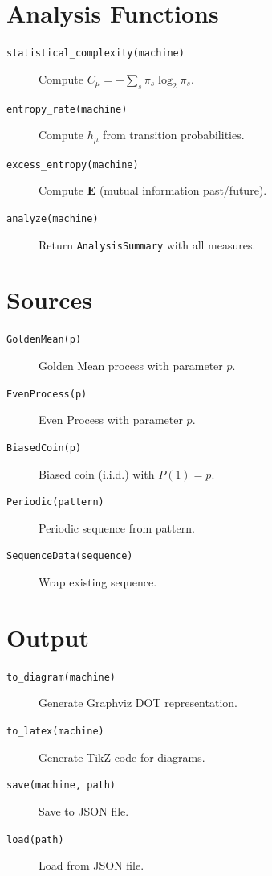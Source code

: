 \documentclass[11pt,a4paper]{report}
\theoremstyle{definition}
\theoremstyle{plain}
\newcommand{\Cmu}{C_\mu}
\newcommand{\hmu}{h_\mu}
\begin{document}
\section{Analysis Functions}

\begin{description}
    \item[\texttt{statistical\_complexity(machine)}] Compute $\Cmu = -\sum_s \pi_s \log_2 \pi_s$.

    \item[\texttt{entropy\_rate(machine)}] Compute $\hmu$ from transition probabilities.

    \item[\texttt{excess\_entropy(machine)}] Compute $\mathbf{E}$ (mutual information past/future).

    \item[\texttt{analyze(machine)}] Return \texttt{AnalysisSummary} with all measures.
\end{description}

\section{Sources}

\begin{description}
    \item[\texttt{GoldenMean(p)}] Golden Mean process with parameter $p$.
    \item[\texttt{EvenProcess(p)}] Even Process with parameter $p$.
    \item[\texttt{BiasedCoin(p)}] Biased coin (i.i.d.) with $P(1) = p$.
    \item[\texttt{Periodic(pattern)}] Periodic sequence from pattern.
    \item[\texttt{SequenceData(sequence)}] Wrap existing sequence.
\end{description}

\section{Output}

\begin{description}
    \item[\texttt{to\_diagram(machine)}] Generate Graphviz DOT representation.
    \item[\texttt{to\_latex(machine)}] Generate TikZ code for diagrams.
    \item[\texttt{save(machine, path)}] Save to JSON file.
    \item[\texttt{load(path)}] Load from JSON file.
\end{description}

\printbibliography
\end{document}
